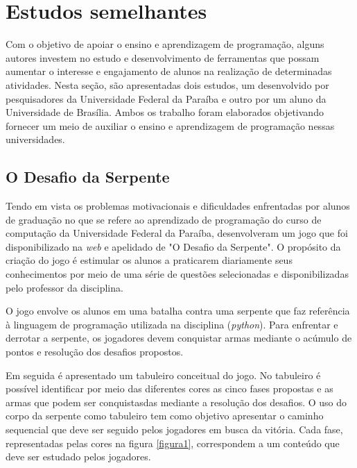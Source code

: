 \section{Estudos semelhantes}

Com o objetivo de apoiar o ensino e aprendizagem de programação, alguns autores investem no estudo e desenvolvimento
de ferramentas que possam aumentar o interesse e engajamento de alunos na realização de determinadas atividades. Nesta
seção, são apresentadas dois estudos, um desenvolvido por pesquisadores da Universidade Federal da Paraíba e outro por um aluno
da Universidade de Brasília. Ambos os trabalho foram elaborados objetivando fornecer um meio de auxiliar o ensino e aprendizagem 
de programação nessas universidades.

\subsection{O Desafio da Serpente}
Tendo em vista os problemas motivacionais e dificuldades enfrentadas por alunos de graduação no que se refere ao
aprendizado de programação do curso de computação da Universidade Federal
da Paraíba,  desenvolveram um jogo que foi disponibilizado na \textit{web} {\itshape} e apelidado
de "O Desafio da Serpente". O propósito da criação do jogo é estimular os alunos a praticarem diariamente seus conhecimentos
por meio de uma série de questões selecionadas e disponibilizadas pelo professor da disciplina.

O jogo envolve os alunos em uma batalha contra uma serpente que faz referência à linguagem de programação utilizada na
disciplina (\textit{python}{\itshape}). Para enfrentar e derrotar a serpente, os jogadores devem conquistar armas mediante o acúmulo
de pontos e resolução dos desafios propostos. 

Em seguida é apresentado um tabuleiro conceitual do jogo. No tabuleiro é possível
identificar por meio das diferentes cores as cinco fases propostas e as armas que podem ser conquistasdas mediante a
resolução dos desafios. O uso do corpo da serpente como tabuleiro tem como objetivo apresentar o caminho sequencial que deve
ser seguido pelos jogadores em busca da vitória. Cada fase, representadas pelas cores na figura \ref{figura1}, correspondem a um conteúdo
que deve ser estudado pelos jogadores.

